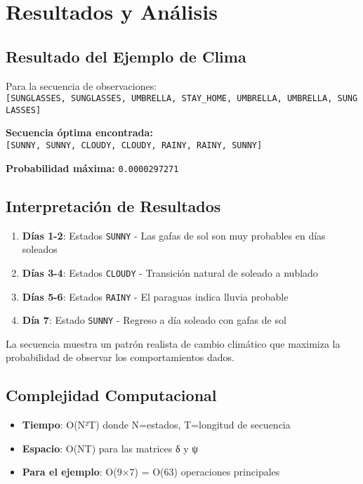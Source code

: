 \documentclass[
]{article}
\providecommand{\tightlist}{%
  \setlength{\itemsep}{0pt}\setlength{\parskip}{0pt}}
\begin{document}
\section{Resultados y Análisis}\label{resultados-y-anuxe1lisis}

\subsection{Resultado del Ejemplo de
Clima}\label{resultado-del-ejemplo-de-clima}

Para la secuencia de observaciones:
\texttt{{[}SUNGLASSES,\ SUNGLASSES,\ UMBRELLA,\ STAY\_HOME,\ UMBRELLA,\ UMBRELLA,\ SUNGLASSES{]}}

\textbf{Secuencia óptima encontrada:}
\texttt{{[}SUNNY,\ SUNNY,\ CLOUDY,\ CLOUDY,\ RAINY,\ RAINY,\ SUNNY{]}}

\textbf{Probabilidad máxima:} \texttt{0.0000297271}

\subsection{Interpretación de
Resultados}\label{interpretaciuxf3n-de-resultados}

\begin{enumerate}
\def\labelenumi{\arabic{enumi}.}
\tightlist
\item
  \textbf{Días 1-2}: Estados \texttt{SUNNY} - Las gafas de sol son muy
  probables en días soleados
\item
  \textbf{Días 3-4}: Estados \texttt{CLOUDY} - Transición natural de
  soleado a nublado
\item
  \textbf{Días 5-6}: Estados \texttt{RAINY} - El paraguas indica lluvia
  probable
\item
  \textbf{Día 7}: Estado \texttt{SUNNY} - Regreso a día soleado con
  gafas de sol
\end{enumerate}

La secuencia muestra un patrón realista de cambio climático que maximiza
la probabilidad de observar los comportamientos dados.

\subsection{Complejidad Computacional}\label{complejidad-computacional}

\begin{itemize}
\tightlist
\item
  \textbf{Tiempo}: O(N²T) donde N=estados, T=longitud de secuencia
\item
  \textbf{Espacio}: O(NT) para las matrices δ y ψ
\item
  \textbf{Para el ejemplo}: O(9×7) = O(63) operaciones principales
\end{itemize}
\end{document}
